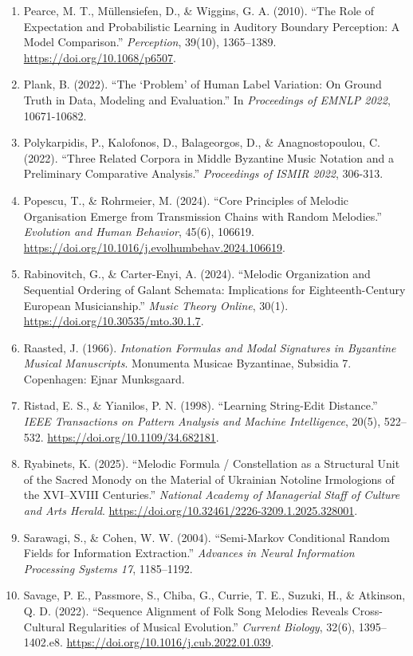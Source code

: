 \documentclass[11pt,a4paper]{article}
\begin{document}
\begin{enumerate}
\item
 Pearce, M. T., Müllensiefen, D., \& Wiggins, G. A. (2010). ``The Role of Expectation and Probabilistic Learning in Auditory Boundary Perception: A Model Comparison.'' \emph{Perception}, 39(10), 1365--1389. \url{https://doi.org/10.1068/p6507}.
\item
 Plank, B. (2022). ``The `Problem' of Human Label Variation: On Ground Truth in Data, Modeling and Evaluation.'' In \emph{Proceedings of EMNLP 2022}, 10671-10682.
\item
 Polykarpidis, P., Kalofonos, D., Balageorgos, D., \& Anagnostopoulou, C. (2022). ``Three Related Corpora in Middle Byzantine Music Notation and a Preliminary Comparative Analysis.'' \emph{Proceedings of ISMIR 2022}, 306-313.
\item
 Popescu, T., \& Rohrmeier, M. (2024). ``Core Principles of Melodic Organisation Emerge from Transmission Chains with Random Melodies.'' \emph{Evolution and Human Behavior}, 45(6), 106619. \url{https://doi.org/10.1016/j.evolhumbehav.2024.106619}.
\item
 Rabinovitch, G., \& Carter-Enyi, A. (2024). ``Melodic Organization and Sequential Ordering of Galant Schemata: Implications for Eighteenth-Century European Musicianship.'' \emph{Music Theory Online}, 30(1). \url{https://doi.org/10.30535/mto.30.1.7}.
\item
 Raasted, J. (1966). \emph{Intonation Formulas and Modal Signatures in Byzantine Musical Manuscripts}. Monumenta Musicae Byzantinae, Subsidia 7. Copenhagen: Ejnar Munksgaard.
\item
 Ristad, E. S., \& Yianilos, P. N. (1998). ``Learning String-Edit Distance.'' \emph{IEEE Transactions on Pattern Analysis and Machine Intelligence}, 20(5), 522--532. \url{https://doi.org/10.1109/34.682181}.
\item
 Ryabinets, K. (2025). ``Melodic Formula / Constellation as a Structural Unit of the Sacred Monody on the Material of Ukrainian Notoline Irmologions of the XVI--XVIII Centuries.'' \emph{National Academy of Managerial Staff of Culture and Arts Herald}. \url{https://doi.org/10.32461/2226-3209.1.2025.328001}.
\item
 Sarawagi, S., \& Cohen, W. W. (2004). ``Semi-Markov Conditional Random Fields for Information Extraction.'' \emph{Advances in Neural Information Processing Systems 17}, 1185--1192.
\item
 Savage, P. E., Passmore, S., Chiba, G., Currie, T. E., Suzuki, H., \& Atkinson, Q. D. (2022). ``Sequence Alignment of Folk Song Melodies Reveals Cross-Cultural Regularities of Musical Evolution.'' \emph{Current Biology}, 32(6), 1395--1402.e8. \url{https://doi.org/10.1016/j.cub.2022.01.039}.

\end{enumerate}
\end{document}
